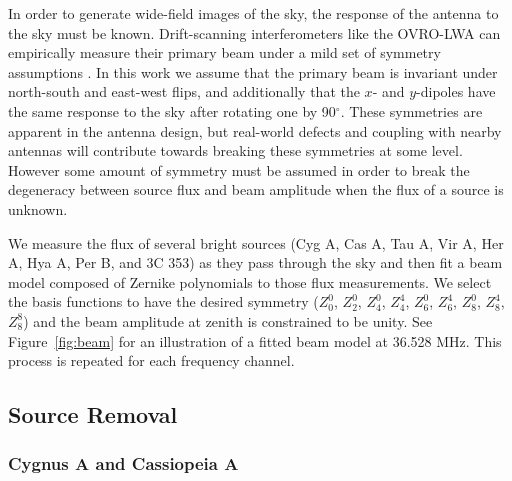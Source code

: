 \documentclass[twocolumn]{aastex61}
\begin{document}
In order to generate wide-field images of the sky, the response of the antenna to the sky must be
known. Drift-scanning interferometers like the OVRO-LWA can empirically measure their
primary beam under a mild set of symmetry assumptions \citep{2012AJ....143...53P}. In this work we
assume that the primary beam is invariant under north-south and east-west flips, and additionally
that the $x$- and $y$-dipoles have the same response to the sky after rotating one by 90$^\circ$.
These symmetries are apparent in the antenna design, but real-world defects and coupling with nearby
antennas will contribute towards breaking these symmetries at some level. However some amount of
symmetry must be assumed in order to break the degeneracy between source flux and beam amplitude
when the flux of a source is unknown.

We measure the flux of several bright sources (Cyg A, Cas A, Tau A, Vir A, Her A, Hya A, Per B, and
3C 353) as they pass through the sky and then fit a beam model composed of Zernike polynomials to
those flux measurements. We select the basis functions to have the desired symmetry ($Z_0^0$,
$Z_2^0$, $Z_4^0$, $Z_4^4$, $Z_6^0$, $Z_6^4$, $Z_8^0$, $Z_8^4$, $Z_8^8$) and the beam amplitude at
zenith is constrained to be unity. See Figure~\ref{fig:beam} for an illustration of a fitted beam
model at 36.528 MHz. This process is repeated for each frequency channel.

\subsection{Source Removal}

\subsubsection{Cygnus A and Cassiopeia A}

\end{document}
